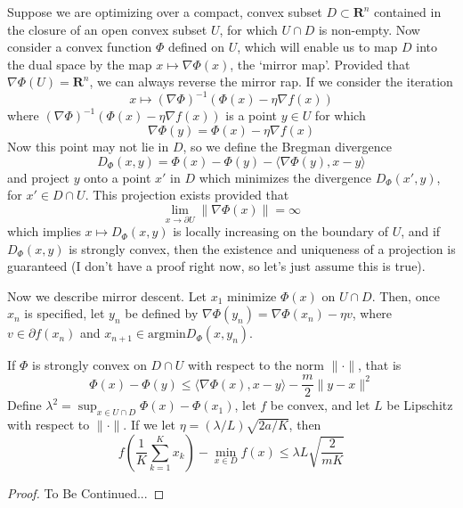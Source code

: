 Suppose we are optimizing over a compact, convex subset $D \subset \mathbf{R}^n$ contained in the closure of an open convex subset $U$, for which $U \cap D$ is non-empty. Now consider a convex function $\Phi$ defined on $U$, which will enable us to map $D$ into the dual space by the map $x \mapsto \nabla \Phi(x)$, the `mirror map'. Provided that $\nabla \Phi(U) = \mathbf{R}^n$, we can always reverse the mirror rap. If we consider the iteration
%
\[ x \mapsto (\nabla \Phi)^{-1}(\Phi(x) - \eta \nabla f(x)) \]
%
where $(\nabla \Phi)^{-1}(\Phi(x) - \eta \nabla f(x))$ is a point $y \in U$ for which
%
\[ \nabla \Phi(y) = \Phi(x) - \eta \nabla f(x) \]
%
Now this point may not lie in $D$, so we define the Bregman divergence
%
\[ D_\Phi(x,y) = \Phi(x) - \Phi(y) - \langle \nabla \Phi(y), x - y \rangle \]
%
and project $y$ onto a point $x'$ in $D$ which minimizes the divergence $D_\Phi(x',y)$, for $x' \in D \cap U$. This projection exists provided that
%
\[ \lim_{x \to \partial U} \| \nabla \Phi(x) \| =  \infty \]
%
which implies $x \mapsto D_\Phi(x,y)$ is locally increasing on the boundary of $U$, and if $D_\Phi(x,y)$ is strongly convex, then the existence and uniqueness of a projection is guaranteed (I don't have a proof right now, so let's just assume this is true).

Now we describe mirror descent. Let $x_1$ minimize $\Phi(x)$ on $U \cap D$. Then, once $x_n$ is specified, let $y_n$ be defined by $\nabla \Phi(y_n) = \nabla \Phi(x_n) - \eta v$, where $v \in \partial f(x_n)$ and $x_{n+1} \in \text{argmin} D_\Phi(x,y_n)$.

\begin{theorem}
    If $\Phi$ is strongly convex on $D \cap U$ with respect to the norm $\| \cdot \|$, that is
    \[ \Phi(x) - \Phi(y) \leq \langle \nabla \Phi(x), x - y \rangle - \frac{m}{2} \| y - x \|^2 \]
    Define $\lambda^2 = \sup_{x \in U \cap D} \Phi(x) - \Phi(x_1)$, let $f$ be convex, and let $L$ be Lipschitz with respect to $\| \cdot \|$. If we let $\eta = (\lambda/L) \sqrt{2a/K}$, then
    \[ f \left( \frac{1}{K} \sum_{k = 1}^K x_k \right) - \min_{x \in D} f(x) \leq \lambda L \sqrt{\frac{2}{mK}} \]
\end{theorem}
\begin{proof}
    To Be Continued...
\end{proof}

